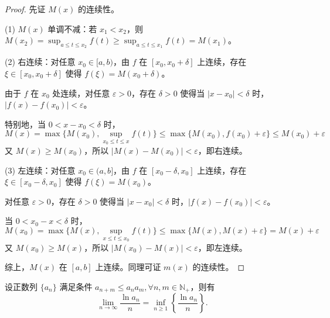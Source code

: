 \documentclass[lang=cn,12pt]{elegantbook}
\begin{document}
\begin{proof}
先证 $M(x)$ 的连续性。

(1) $M(x)$ 单调不减：若 $x_1 < x_2$，则 $M(x_2) = \sup_{a \leq t \leq x_2} f(t) \geq \sup_{a \leq t \leq x_1} f(t) = M(x_1)$。

(2) 右连续：对任意 $x_0 \in [a,b)$，由 $f$ 在 $[x_0, x_0+\delta]$ 上连续，存在 $\xi \in [x_0, x_0+\delta]$ 使得 $f(\xi) = M(x_0+\delta)$。

由于 $f$ 在 $x_0$ 处连续，对任意 $\varepsilon > 0$，存在 $\delta > 0$ 使得当 $|x - x_0| < \delta$ 时，$|f(x) - f(x_0)| < \varepsilon$。

特别地，当 $0 < x - x_0 < \delta$ 时，
\[
M(x) = \max\{M(x_0), \sup_{x_0 \leq t \leq x} f(t)\} \leq \max\{M(x_0), f(x_0) + \varepsilon\} \leq M(x_0) + \varepsilon
\]
又 $M(x) \geq M(x_0)$，所以 $|M(x) - M(x_0)| < \varepsilon$，即右连续。

(3) 左连续：对任意 $x_0 \in (a,b]$，由 $f$ 在 $[x_0-\delta, x_0]$ 上连续，存在 $\xi \in [x_0-\delta, x_0]$ 使得 $f(\xi) = M(x_0)$。

对任意 $\varepsilon > 0$，存在 $\delta > 0$ 使得当 $|x - x_0| < \delta$ 时，$|f(x) - f(x_0)| < \varepsilon$。

当 $0 < x_0 - x < \delta$ 时，
\[
M(x_0) = \max\{M(x), \sup_{x \leq t \leq x_0} f(t)\} \leq \max\{M(x), M(x) + \varepsilon\} = M(x) + \varepsilon
\]
又 $M(x_0) \geq M(x)$，所以 $|M(x_0) - M(x)| < \varepsilon$，即左连续。

综上，$M(x)$ 在 $[a,b]$ 上连续。同理可证 $m(x)$ 的连续性。
\end{proof}

\begin{example}
设正数列 \(\{a_n\}\) 满足条件 \(a_{n+m} \leq a_n a_m, \forall n, m \in \mathbb{N}_+\)，则有
\[
\lim_{n \to \infty} \frac{\ln a_n}{n} = \inf_{n \geq 1} \left\{ \frac{\ln a_n}{n} \right\}.
\]
\end{example}
\end{document}
